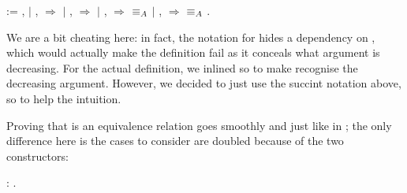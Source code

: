 \begin{coqdoccode}
  \coqdocnoindent
{}    :=  , \coqdoceol
\coqdocindent{1.00em}
\ensuremath{|}  \coqdocvar{\_} \coqdocvar{\_},  \coqdocvar{\_} \coqdocvar{\_} \ensuremath{\Rightarrow} \coqdoceol
\coqdocindent{1.00em}
\ensuremath{|}  \coqdocvar{\_} \coqdocvar{\_},  \coqdocvar{\_} \coqdocvar{\_} \ensuremath{\Rightarrow} \coqdoceol
\coqdocindent{1.00em}
\ensuremath{|}  \coqdocvar{\_} ,  \coqdocvar{\_}  \ensuremath{\Rightarrow}  $\equiv_A$  \coqdoceol
\coqdocindent{1.00em}
\ensuremath{|}  \coqdocvar{\_} ,  \coqdocvar{\_}  \ensuremath{\Rightarrow}  $\equiv_A$  \coqdoceol
\coqdocnoindent
{}.\coqdoceol

\end{coqdoccode}

We are a bit cheating here: in fact, the notation for \AEQ{} hides a dependency on , which would actually make the  definition fail as it conceals what argument is decreasing. For the actual \Coq{} definition, we inlined  so to make \Coq{} recognise the decreasing argument. However, we decided to just use the succint notation above, so to help the intuition.

\medskip

Proving that  is an equivalence relation goes smoothly and just like in \ZF{}; the only difference here is the cases to consider are doubled because of the two constructors:

\begin{coqdoccode}
  \coqdocnoindent
    :  .
\end{coqdoccode}

